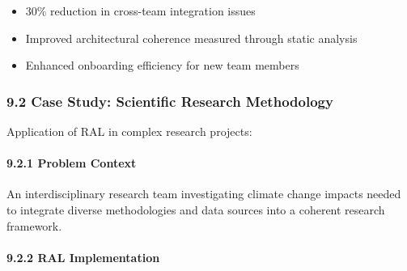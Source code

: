 \documentclass[
]{article}
\providecommand{\tightlist}{%
  \setlength{\itemsep}{0pt}\setlength{\parskip}{0pt}}
\begin{document}
\begin{itemize}
\tightlist
\item
  30\% reduction in cross-team integration issues
\item
  Improved architectural coherence measured through static analysis
\item
  Enhanced onboarding efficiency for new team members
\end{itemize}

\subsubsection{9.2 Case Study: Scientific Research
Methodology}\label{case-study-scientific-research-methodology}

Application of RAL in complex research projects:

\paragraph{9.2.1 Problem Context}\label{problem-context-1}

An interdisciplinary research team investigating climate change impacts
needed to integrate diverse methodologies and data sources into a
coherent research framework.

\paragraph{9.2.2 RAL Implementation}\label{ral-implementation-1}
\end{document}

